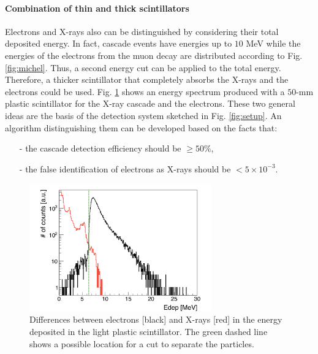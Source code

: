 \documentclass[12pt]{article}
\begin{document}
\paragraph{Combination of thin and thick scintillators}
Electrons and X-rays also can be distinguished by considering their total deposited energy. In fact, cascade events have energies up to $10$ MeV while the energies of the electrons from the muon decay are distributed according to Fig. \ref{fig:michel}. Thus, a second energy cut can be applied to the total energy. Therefore, a thicker scintillator that completely absorbs the X-rays and the electrons could be used. Fig. \ref{fig:separation} shows an energy spectrum produced with a $50$-mm plastic scintillator for the X-ray cascade and the electrons. These two general ideas are the basis of the detection system sketched in Fig. \ref{fig:setup}. An algorithm distinguishing them can be developed based on the facts that:
\begin{itemize}
\item[-]
	the cascade detection efficiency should be $\geq 50 \%$,
\item[-]
	the false identification of electrons as X-rays should be $< 5 \times 10^{-3}$.
\end{itemize}
\begin{figure}[ht!]
\centering
\includegraphics[width=0.7\textwidth]{img/separation}
\caption{Differences between electrons [black] and X-rays [red] in the energy deposited in the light plastic scintillator. The green dashed line shows a possible location for a cut to separate the particles.}
\label{fig:separation}
\end{figure}
\end{document}
